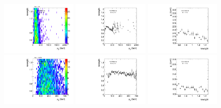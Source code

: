 \begin{figure}[htbp!]
\begin{center}
\includegraphics[angle=270, width=0.32\textwidth]{./figures/boosted/AppendixReweight/Weights/4Trk_Sideband_leadHCand_trk0_Pt_weight.pdf}
\includegraphics[angle=270, width=0.32\textwidth]{./figures/boosted/AppendixReweight/Weights/4Trk_Sideband_leadHCand_trk0_Pt_weight_profx.pdf}
\includegraphics[angle=270, width=0.32\textwidth]{./figures/boosted/AppendixReweight/Weights/4Trk_Sideband_leadHCand_trk0_Pt_weight_profy.pdf}\\
\includegraphics[angle=270, width=0.32\textwidth]{./figures/boosted/AppendixReweight/Weights/4Trk_Sideband_sublHCand_trk0_Pt_weight.pdf}
\includegraphics[angle=270, width=0.32\textwidth]{./figures/boosted/AppendixReweight/Weights/4Trk_Sideband_sublHCand_trk0_Pt_weight_profx.pdf}
\includegraphics[angle=270, width=0.32\textwidth]{./figures/boosted/AppendixReweight/Weights/4Trk_Sideband_sublHCand_trk0_Pt_weight_profy.pdf}\\

\end{center}
\end{figure}
